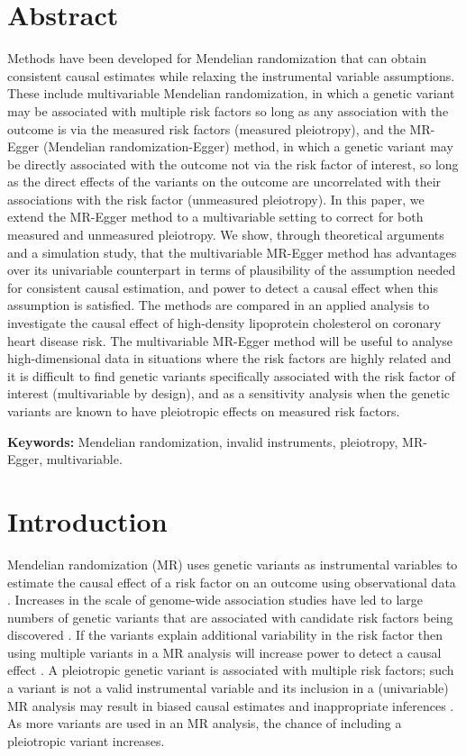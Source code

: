 \documentclass[a4paper,12pt]{article}
\begin{document}
\begin{bibunit}[wileyj]
\section*{Abstract}
Methods have been developed for Mendelian randomization that can obtain consistent causal estimates while relaxing the instrumental variable assumptions. These include multivariable Mendelian randomization, in which a genetic variant may be associated with multiple risk factors so long as any association with the outcome is via the measured risk factors (measured pleiotropy), and the MR-Egger (Mendelian randomization-Egger) method, in which a genetic variant may be directly associated with the outcome not via the risk factor of interest, so long as the direct effects of the variants on the outcome are uncorrelated with their associations with the risk factor (unmeasured pleiotropy). In this paper, we extend the MR-Egger method to a multivariable setting to correct for both measured and unmeasured pleiotropy. We show, through theoretical arguments and a simulation study, that the multivariable MR-Egger method has advantages over its univariable counterpart in terms of plausibility of the assumption needed for consistent causal estimation, and power to detect a causal effect when this assumption is satisfied. The methods are compared in an applied analysis to investigate the causal effect of high-density lipoprotein cholesterol on coronary heart disease risk. The multivariable MR-Egger method will be useful to analyse high-dimensional data in situations where the risk factors are highly related and it is difficult to find genetic variants specifically associated with the risk factor of interest (multivariable by design), and as a sensitivity analysis when the genetic variants are known to have pleiotropic effects on measured risk factors.

\textbf{Keywords:} Mendelian randomization, invalid instruments, pleiotropy, MR-Egger, multivariable. 
\pagebreak

\section{Introduction}
Mendelian randomization (MR) uses genetic variants as instrumental variables to estimate the causal effect of a risk factor on an outcome using observational data \cite{smith2003, lawlor2008}. Increases in the scale of genome-wide association studies have led to large numbers of genetic variants that are associated with candidate risk factors being discovered \cite{sleiman2010}. If the variants explain additional variability in the risk factor then using multiple variants in a MR analysis will increase power to detect a causal effect \cite{brion2013power, freeman2013power}. A pleiotropic genetic variant is associated with multiple risk factors; such a variant is not a valid instrumental variable and its inclusion in a (univariable) MR analysis may result in biased causal estimates and inappropriate inferences \cite{burgess2013scores}. As more variants are used in an MR analysis, the chance of including a pleiotropic variant increases.


\end{bibunit}
\end{document}
